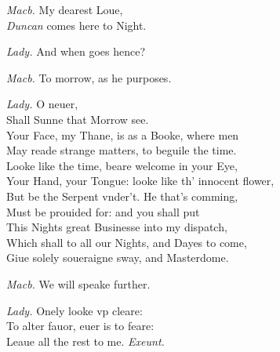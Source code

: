 \documentclass[12pt]{sides}
\newcommand{\dia}[1]{\hskip 15pt\textit{#1}\hskip 6pt}
\begin{document}
\begin{multicols}{2}
            \dia{Macb.} My dearest Loue, \\ \textit{Duncan} comes here to Night.

            \dia{Lady.} And when goes hence?

            \dia{Macb.} To morrow, as he purposes.

            \dia{Lady.} O neuer, \\ Shall Sunne that Morrow see. \\ Your Face, my Thane, is as a Booke, where men \\ May reade strange matters, to beguile the time. \\ Looke like the time, beare welcome in your Eye, \\ Your Hand, your Tongue: looke like th' innocent flower, \\ But be the Serpent vnder't. He that's comming, \\ Must be prouided for: and you shall put \\ This Nights great Businesse into my dispatch, \\ Which shall to all our Nights, and Dayes to come, \\ Giue solely soueraigne sway, and Masterdome.

            \dia{Macb.} We will speake further.
            
            \dia{Lady.} Onely looke vp cleare: \\ To alter fauor, euer is to feare: \\ Leaue all the rest to me. \hspace{32pt} \textit{Exeunt.}
            \vspace{30pt} %
	\end{multicols}
\end{document}
